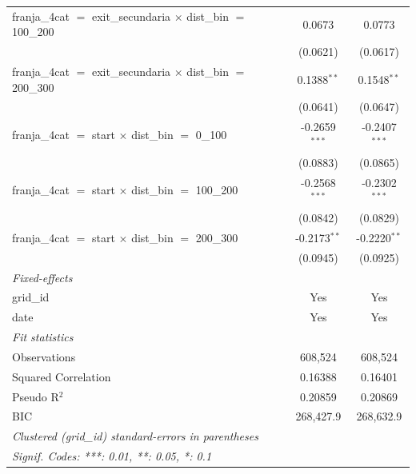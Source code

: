 \begin{tabular}{lcc}
   franja\_4cat $=$ exit\_secundaria $\times$ dist\_bin $=$ 100\_200      & 0.0673          & 0.0773\\   
                                                                          & (0.0621)        & (0.0617)\\   
   franja\_4cat $=$ exit\_secundaria $\times$ dist\_bin $=$ 200\_300      & 0.1388$^{**}$   & 0.1548$^{**}$\\   
                                                                          & (0.0641)        & (0.0647)\\   
   franja\_4cat $=$ start $\times$ dist\_bin $=$ 0\_100                   & -0.2659$^{***}$ & -0.2407$^{***}$\\   
                                                                          & (0.0883)        & (0.0865)\\   
   franja\_4cat $=$ start $\times$ dist\_bin $=$ 100\_200                 & -0.2568$^{***}$ & -0.2302$^{***}$\\   
                                                                          & (0.0842)        & (0.0829)\\   
   franja\_4cat $=$ start $\times$ dist\_bin $=$ 200\_300                 & -0.2173$^{**}$  & -0.2220$^{**}$\\   
                                                                          & (0.0945)        & (0.0925)\\   
   \midrule
   \emph{Fixed-effects}\\
   grid\_id                                                               & Yes             & Yes\\  
   date                                                                   & Yes             & Yes\\  
   \midrule
   \emph{Fit statistics}\\
   Observations                                                           & 608,524         & 608,524\\  
   Squared Correlation                                                    & 0.16388         & 0.16401\\  
   Pseudo R$^2$                                                           & 0.20859         & 0.20869\\  
   BIC                                                                    & 268,427.9       & 268,632.9\\  
   \midrule \midrule
   \multicolumn{3}{l}{\emph{Clustered (grid\_id) standard-errors in parentheses}}\\
   \multicolumn{3}{l}{\emph{Signif. Codes: ***: 0.01, **: 0.05, *: 0.1}}\\
\end{tabular}
\par\endgroup


